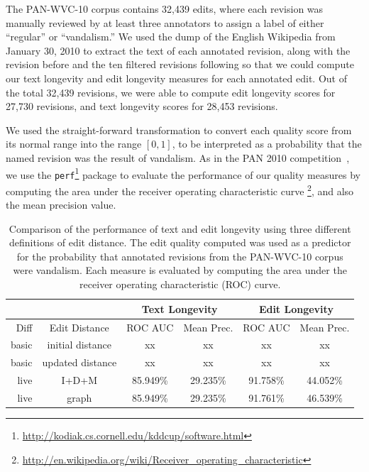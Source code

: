 The PAN-WVC-10 corpus contains 32,439 edits, where each revision was
manually reviewed by at least three annotators to assign a label
of either ``regular'' or ``vandalism.''
We used the dump of the English Wikipedia from January 30, 2010
to extract the text of each annotated revision, along with the revision
before and the ten filtered revisions following so that we could compute
our text longevity and edit longevity measures for each annotated edit.
Out of the total 32,439 revisions, we were able to compute
edit longevity scores for 27,730 revisions, and text longevity
scores for 28,453 revisions.

We used the straight-forward transformation to convert
each quality score from its normal range into the range
$[0,1]$, to be interpreted as a probability that the named
revision was the result of vandalism.
As in the PAN 2010 competition~\cite{Potthast2010b}, we use the
\texttt{perf}\footnote{\url{http://kodiak.cs.cornell.edu/kddcup/software.html}}
package to evaluate the performance of our quality measures
by computing the area under the receiver operating characteristic
curve \footnote{\url{http://en.wikipedia.org/wiki/Receiver_operating_characteristic}},
and also the mean precision value.



\begin{table}[htbp]
\begin{center}
\begin{tabular}{|r|c|c|c|c|c|}
\cline{3-6}
\multicolumn{2}{c|}{} & \multicolumn{2}{|c|}{Text Longevity} & \multicolumn{2}{|c|}{Edit Longevity} \\
\hline
Diff & Edit Distance & ROC AUC & Mean Prec. & ROC AUC & Mean Prec. \\
\hline
\hline
basic & initial distance & xx & xx & xx & xx \\
basic & updated distance & xx & xx & xx & xx \\
live & I+D+M & 85.949\% & 29.235\% & 91.758\% & 44.052\% \\
live & graph & 85.949\% & 29.235\% & 91.761\% & 46.539\% \\
\hline
\end{tabular}
\end{center}
\caption{Comparison of the performance of text and edit longevity
  using three different definitions of edit distance.
  The edit quality computed was used as a predictor for the probability
  that annotated revisions from the PAN-WVC-10 corpus were vandalism.
  Each measure is evaluated by computing the area under the
  receiver operating characteristic (ROC) curve.
} 
\label{tbl:editquality}
\end{table}


